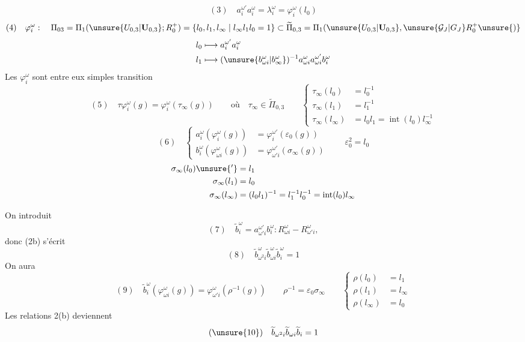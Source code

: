 \[
(3)\quad a_i^{\omega'}a_i^\omega=\lambda_i^\omega=\varphi_i^\omega(l_0)
\]
\[
(4)\quad \varphi_i^\omega:\quad
\Pi_{03}=\Pi_1(\unsure{U_{0,3}|\mathbf U_{0,3}};R_0^+)=\{l_0,l_1,l_\infty\mid l_\infty l_1l_0=1\}
\subset\widetilde\Pi_{0,3}=\Pi_1(\unsure{U_{0,3}|\mathbf U_{0,3}},\unsure{\mathcal G_J|G_J} R_0^+\unsure{)}
\]
\[
\begin{aligned}
l_0&\longmapsto a_i^{\omega'}a_i^\omega\\
l_1&\longmapsto (\unsure{b_{\omega i}^\omega|b_\infty^\omega})^{-1}a_{\omega i}^{\omega}a_{\omega i}^{\omega'}b_i^\omega
\end{aligned}
\]
Les $\varphi_i^\omega$ sont  entre eux   simples  transition
\[
(5)\quad\tau\varphi_i^\omega(g)=\varphi_i^\omega(\tau_\infty(g))
\qquad\text{où}\quad\tau_\infty\in\widetilde\Pi_{0,3}
\qquad\left\{\begin{aligned}
\tau_\infty(l_0)&=l_0^{-1}\\
\tau_\infty(l_1)&=l_1^{-1}\\
\tau_\infty(l_\infty)&=l_0l_1=\operatorname{int}(l_0)l_\infty^{-1}
\end{aligned}\right.
\]
\[
(6)\quad\left\{\begin{aligned}
a_i^\omega(\varphi_i^\omega(g))&=\varphi_i^{\omega'}(\varepsilon_0(g))\\
b_i^\omega(\varphi_{\omega i}^\omega(g))&=\varphi_{\omega'i}^{\omega'}(\sigma_\infty(g))
\end{aligned}\right.
\qquad\varepsilon_0^2=l_0
\]
\[
\begin{aligned}
\sigma_\infty(l_0)\unsure{'}&=l_1\\
\sigma_\infty(l_1)&=l_0\\
\sigma_\infty(l_\infty)&=(l_0l_1)^{-1}=l_1^{-1}l_0^{-1}=\operatorname{int}(l_0)l_\infty
\end{aligned}
\]

On introduit
\[
(7)\quad\widetilde b_i^\omega=a_{\omega'i}^{\omega'}b_i^\omega:
R_{\omega i}^\omega\mathbin{-}R_{\omega'i}^\omega,
\]
donc (2b) s'écrit
\[
(8)\quad\widetilde b_{\omega^2i}^\omega\widetilde b_{\omega i}^\omega\widetilde b_i^\omega=1
\]
On aura
\[
(9)\quad\widetilde b_i^\omega(\varphi_{\omega i}^\omega(g))=\varphi_{\omega'i}^\omega(\rho^{-1}(g))
\qquad\rho^{-1}=\varepsilon_0\sigma_\infty
\qquad\left\{\begin{aligned}
\rho(l_0)&=l_1\\
\rho(l_1)&=l_\infty\\
\rho(l_\infty)&=l_0
\end{aligned}\right.
\]
Les relations 2(b) deviennent
\[
(\unsure{10})\quad\widetilde b_{\omega^2i}\widetilde b_{\omega i}\widetilde b_i=1
\]

